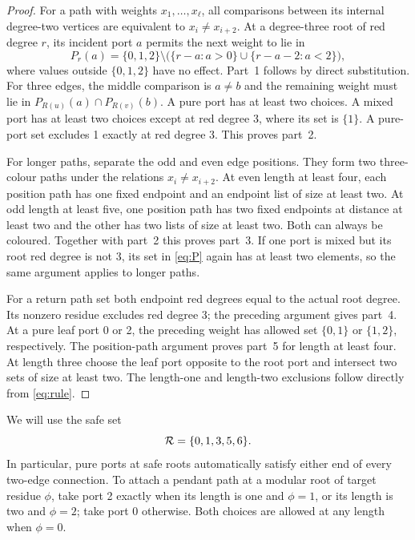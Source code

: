 \begin{proof}
For a path with weights $x_1,\ldots,x_\ell$, all comparisons between its
internal degree-two vertices are equivalent to
$x_i\ne x_{i+2}$.  At a degree-three root of red degree $r$, its incident
port $a$ permits the next weight to lie in
\begin{equation}\label{eq:P}
 P_r(a)=\{0,1,2\}\setminus
 \bigl(\{r-a:a>0\}\cup\{r-a-2:a<2\}\bigr),
\end{equation}
where values outside $\{0,1,2\}$ have no effect.
Part~1 follows by direct substitution.  For three edges, the middle
comparison is $a\ne b$ and the remaining weight must lie in
$P_{R(u)}(a)\cap P_{R(v)}(b)$.  A pure port has at least two choices.
A mixed port has at least two choices except at red degree 3, where its
set is $\{1\}$.  A pure-port set excludes 1 exactly at red degree 3.
This proves part~2.

For longer paths, separate the odd and even edge positions.  They form
two three-colour paths under the relations $x_i\ne x_{i+2}$.
At even length at least four, each position path has one fixed endpoint
and an endpoint list of size at least two.  At odd length at least five,
one position path has two fixed endpoints at distance at least two and
the other has two lists of size at least two.  Both can always be coloured.
Together with part~2 this proves part~3.  If one port is mixed but its
root red degree is not 3, its set in \eqref{eq:P} again has at least two
elements, so the same argument applies to longer paths.

For a return path set both endpoint red degrees equal to the actual
root degree.  Its nonzero residue excludes red degree 3; the preceding
argument gives part~4.  At a pure leaf port 0 or 2, the preceding weight
has allowed set $\{0,1\}$ or $\{1,2\}$, respectively.  The position-path
argument proves part~5 for length at least four.  At length three choose
the leaf port opposite to the root port and intersect two sets of size at
least two.  The length-one and length-two exclusions follow directly
from \eqref{eq:rule}.
\end{proof}

We will use the safe set
\begin{equation}\label{eq:safe}
 \mathcal R=\{0,1,3,5,6\}.
\end{equation}
In particular, pure ports at safe roots automatically satisfy either
end of every two-edge connection.  To attach a pendant path at a modular
root of target residue $\phi$, take port 2 exactly when its length is one
and $\phi=1$, or its length is two and $\phi=2$; take port 0 otherwise.
Both choices are allowed at any length when $\phi=0$.

